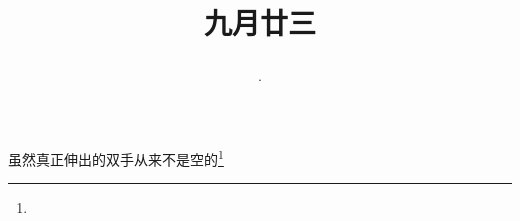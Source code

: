 \title{\date[d=25,m=10,y=2024][year:cn-y,年,month:cn,day:cn,日,·,weekday]·九月廿三 }
虽然真正伸出的双手从来不是空的\footnote{ }

